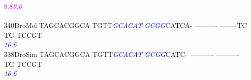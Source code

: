 \documentclass[11pt,twoside,reqno,a4paper]{article}
\begin{document}
{\hspace*{4\charwidth}\hspace*{7\charwidth}\hspace*{0\charwidth}\textcolor{magenta}{8.8}\hspace*{1\charwidth}\hspace*{1\charwidth}\hspace*{1\charwidth}\hspace*{35\charwidth}\textit{\textcolor{magenta}{9.0}}\hspace*{1\charwidth}\hspace*{1\charwidth}\hspace*{1\charwidth}\\
\\
340\hspace*{1\charwidth}DroMel	TAGCACGGCA	TGTT\textit{\textcolor{blue}{G}}\textit{\textcolor{blue}{C}}\textit{\textcolor{blue}{A}}\textit{\textcolor{blue}{C}}\textit{\textcolor{blue}{A}}\textit{\textcolor{blue}{T}}	\textit{\textcolor{blue}{G}}\textit{\textcolor{blue}{C}}\textit{\textcolor{blue}{G}}\textit{\textcolor{blue}{G}}CATCA-	----------	--------TC	TG-TCCGT\\
\hspace*{4\charwidth}\hspace*{7\charwidth}\hspace*{1\charwidth}\hspace*{14\charwidth}\textit{\textcolor{blue}{10.6}}\hspace*{1\charwidth}\hspace*{1\charwidth}\hspace*{1\charwidth}\hspace*{1\charwidth}\\
338\hspace*{1\charwidth}DroSim	TAGCACGGCA	TGTT\textit{\textcolor{blue}{G}}\textit{\textcolor{blue}{C}}\textit{\textcolor{blue}{A}}\textit{\textcolor{blue}{C}}\textit{\textcolor{blue}{A}}\textit{\textcolor{blue}{T}}	\textit{\textcolor{blue}{G}}\textit{\textcolor{blue}{C}}\textit{\textcolor{blue}{G}}\textit{\textcolor{blue}{G}}CATC--	----------	----------	TG-TCCGT\\
\hspace*{4\charwidth}\hspace*{7\charwidth}\hspace*{1\charwidth}\hspace*{14\charwidth}\textit{\textcolor{blue}{10.6}}\hspace*{1\charwidth}\hspace*{1\charwidth}\hspace*{1\charwidth}\hspace*{1\charwidth}\\
}
\end{document}
